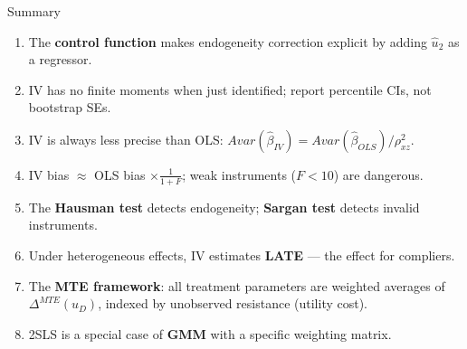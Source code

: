 \documentclass[aspectratio=169, handout]{beamer}
\numberwithin{equation}{section}
\begin{document}
\begin{frame}{Summary}
\begin{enumerate}
\item The \textbf{control function} makes endogeneity correction explicit by adding $\hat{u}_2$ as a regressor.
\item IV has \alert{no finite moments} when just identified; report percentile CIs, not bootstrap SEs.
\item IV is always less precise than OLS: $Avar(\hat{\beta}_{IV})=Avar(\hat{\beta}_{OLS})/\rho^2_{xz}$.
\item IV bias $\approx$ OLS bias $\times\frac{1}{1+F}$; weak instruments ($F<10$) are dangerous.
\item The \textbf{Hausman test} detects endogeneity; \textbf{Sargan test} detects invalid instruments.
\item Under heterogeneous effects, IV estimates \textbf{LATE} --- the effect for compliers.
\item The \textbf{MTE framework}: all treatment parameters are weighted averages of $\Delta^{MTE}(u_D)$, indexed by unobserved resistance (utility cost).
\item 2SLS is a special case of \textbf{GMM} with a specific weighting matrix.
\end{enumerate}
\end{frame}
\end{document}
